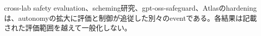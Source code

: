 
cross-lab safety evaluation、scheming研究、gpt-oss-safeguard、Atlasのhardeningは、autonomyの拡大に評価と制御が追従した別々のeventである。各結果は記載された評価範囲を越えて一般化しない。\autocite{src-0ad9fbef8c87,src-2081c76ea2b4,src-240a05c02f85,src-3556c47e80db,src-ad13fe7d3321,src-bef6cbe2a83e}

